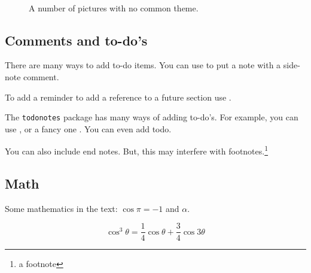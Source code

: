 \lipsum[5-8] %

\begin{figure}[tb]
\centering
{} \quad
{} \\
 \quad
{}
\caption[A number of pictures.]{A number of pictures with no common theme.} %
\label{fig:esempio}
\end{figure}

\subsection{Comments and to-do's}
There are many ways to add to-do items.
You can use  to put a note with a side-note comment.

To add a reminder to add a reference to a future section use
.

The \texttt{todonotes} package has many ways of adding to-do's.
For example, you can use , or a fancy one .
You can even add  todo.

\begin{comment}
Everything inside this section will be ignore.
The comment package can also support generic comment environment, and conditional comments.
\end{comment}

You can also include end notes. 
But, this may interfere with footnotes.\footnote{a footnote}

\subsection{Math}

Some mathematics in the text: $\cos\pi=-1$ and $\alpha$.

\begin{equation}
\cos^3 \theta =\frac{1}{4}\cos\theta+\frac{3}{4}\cos 3\theta
\label{eq:refname2}
\end{equation}

\lipsum[5] %

